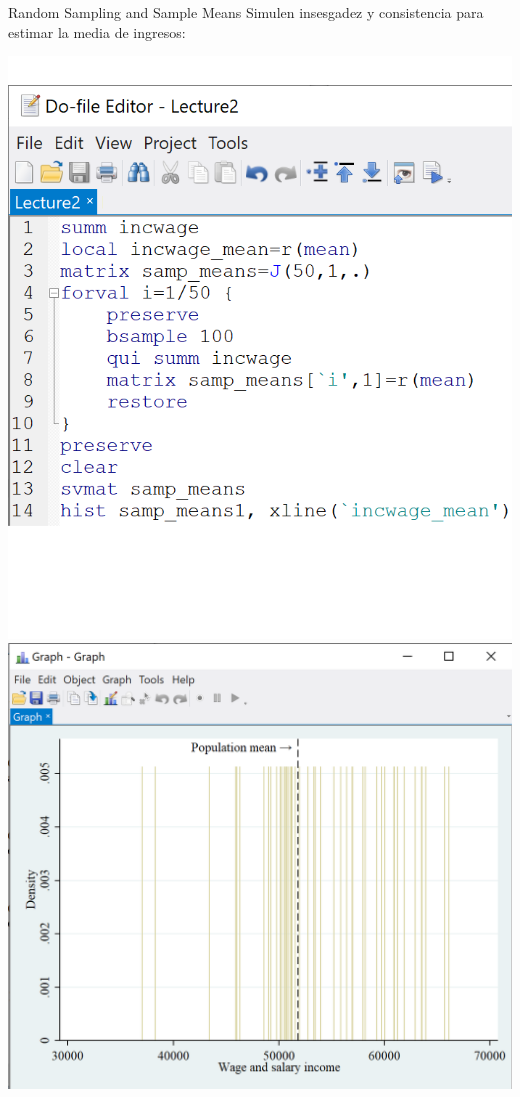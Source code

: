 \documentclass[11pt,handout,aspectratio=169]{beamer}
\begin{document}
\begin{frame}{Random Sampling and Sample Means}
\vspace{0.2cm}
Simulen insesgadez  y consistencia para estimar la media de ingresos:

\begin{center}
\includegraphics[scale=0.45]{stata18.png} \includegraphics[scale=0.5]{stata21.png}
\end{center}

\end{frame}
\end{document}
